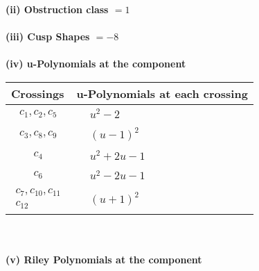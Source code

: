 \documentclass[1p]{elsarticle_modified}
\theoremstyle{definition}
\begin{document}
\flushleft \textbf{(ii) Obstruction class $= 1$}\\~\\
\flushleft \textbf{(iii) Cusp Shapes $= -8$}\\~\\
\newpage\renewcommand{\arraystretch}{1}
\flushleft \textbf{(iv) u-Polynomials at the component}\newline \\
\begin{tabular}{m{50pt}|m{274pt}}
Crossings & \hspace{64pt}u-Polynomials at each crossing \\
\hline $$\begin{aligned}c_{1},c_{2},c_{5}\end{aligned}$$&$\begin{aligned}
&u^2-2
\end{aligned}$\\
\hline $$\begin{aligned}c_{3},c_{8},c_{9}\end{aligned}$$&$\begin{aligned}
&(u-1)^2
\end{aligned}$\\
\hline $$\begin{aligned}c_{4}\end{aligned}$$&$\begin{aligned}
&u^2+2 u-1
\end{aligned}$\\
\hline $$\begin{aligned}c_{6}\end{aligned}$$&$\begin{aligned}
&u^2-2 u-1
\end{aligned}$\\
\hline $$\begin{aligned}c_{7},c_{10},c_{11}\\c_{12}\end{aligned}$$&$\begin{aligned}
&(u+1)^2
\end{aligned}$\\
\hline
\end{tabular}\\~\\
\newpage\renewcommand{\arraystretch}{1}
\flushleft \textbf{(v) Riley Polynomials at the component}\newline \\
\end{document}
